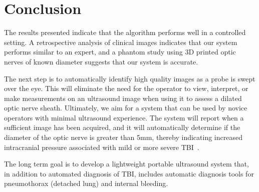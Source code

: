 \documentclass{llncs}
\begin{document}
\section{Conclusion}
The results presented indicate that the algorithm performs well in a controlled
setting.  A retrospective analysis of clinical images indicates that our system
performs similar to an expert, and a phantom study using 3D printed optic
nerves of known diameter suggests that our system is accurate.

The next step is to automatically identify high quality images as a probe is
swept over the eye. This will eliminate the need for the operator to view,
interpret, or make measurements on an ultrasound image when using it to assess
a dilated optic nerve sheath. Ultimately, we aim for a system that can be used
by novice operators with minimal ultrasound experience. The system will report
when a sufficient image has been acquired, and it will automatically determine
if the diameter of the optic nerve is greater than 5mm, thereby indicating
increased intracranial pressure associated with mild or more severe
TBI~\cite{Ma2015}.

The long term goal is to develop a lightweight portable ultrasound
system that, in addition to automated diagnosis of TBI, includes automatic
diagnosis tools for pneumothorax (detached lung) and internal bleeding.
\end{document}
